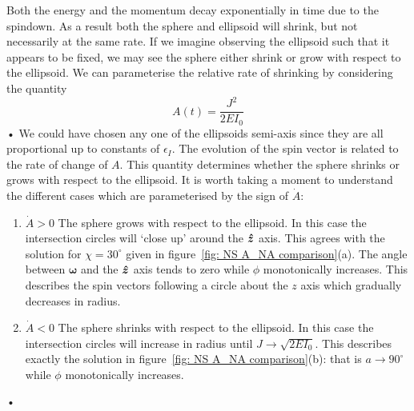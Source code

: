 \documentclass[../full_thesis/full_thesis.tex]{subfiles}
\begin{document}
Both the energy and the momentum decay exponentially in time
due to the spindown. As a result both the sphere and ellipsoid will shrink, but
not necessarily at the same rate. If we imagine observing the ellipsoid such
that it appears to be fixed, we may see the sphere either shrink or grow with
respect to the ellipsoid. We can parameterise the relative rate of shrinking by
considering the quantity
\begin{equation}
A(t)  = \frac{J^{2}} {2EI_{0}}
\label{eqn: A}
\end{equation}•
We could have chosen any one of the ellipsoids semi-axis since they are all
proportional up to constants of $\epsilon_{I}$. The evolution of the spin
vector is related to the rate of change of $A$.
This quantity determines whether the sphere shrinks or grows with respect to
the ellipsoid. It is worth taking a moment to understand the different cases
which are parameterised by the sign of $\dot{A}$:
\begin{enumerate}
\item $\dot{A}>0$ The sphere grows with respect to the ellipsoid. In this case
    the intersection circles will `close up' around the $\boldsymbol{\hat{z}}$ axis. This
    agrees with the solution for $\chi=30^{\circ}$ given in
    figure~\ref{fig: NS A_NA comparison}(a). The angle between
    $\boldsymbol{\omega}$ and the $\boldsymbol{\hat{z}}$ axis tends to zero while $\phi$
    monotonically increases. This describes the spin vectors following a circle
    about the $z$ axis which gradually decreases in radius.
\item $\dot{A}<0$ The sphere shrinks with respect to the ellipsoid. In this
    case the intersection circles will increase in radius until $J\rightarrow
    \sqrt{2EI_{0}}$. This describes exactly the solution in
    figure~\ref{fig: NS A_NA comparison}(b): that is $a\rightarrow
    90^{\circ}$ while $\phi$ monotonically increases.
\end{enumerate}•
\end{document}

